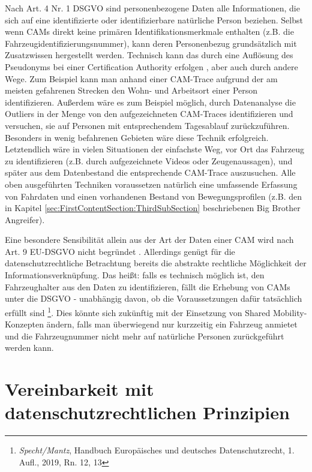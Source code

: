Nach Art. 4 Nr. 1 DSGVO sind personenbezogene Daten alle Informationen, die sich auf eine identifizierte oder identifizierbare natürliche Person beziehen. Selbst wenn CAMs direkt keine primären Identifikationsmerkmale enthalten (z.B. die Fahrzeugidentifizierungsnummer), kann deren Personenbezug grundsätzlich mit Zusatzwissen hergestellt werden. Technisch kann das durch eine Auflösung des Pseudonyms bei einer Certification Authority erfolgen \cite{Kiometzis2017}, aber auch durch andere Wege. Zum Beispiel kann man anhand einer CAM-Trace aufgrund der am meisten gefahrenen Strecken den Wohn- und Arbeitsort einer Person identifizieren. Außerdem wäre es zum Beispiel möglich, durch Datenanalyse die Outliers in der Menge von den aufgezeichneten CAM-Traces identifizieren und versuchen, sie auf Personen mit entsprechendem Tagesablauf zurückzuführen. Besonders in wenig befahrenen Gebieten wäre diese Technik erfolgreich. Letztendlich wäre in vielen Situationen der einfachste Weg, vor Ort das Fahrzeug zu identifizieren (z.B. durch aufgezeichnete Videos oder Zeugenaussagen), und später aus dem Datenbestand die entsprechende CAM-Trace auszusuchen. Alle oben ausgeführten Techniken voraussetzen natürlich eine umfassende Erfassung von Fahrdaten und einen vorhandenen Bestand von Bewegungsprofilen (z.B. den in Kapitel \ref{sec:FirstContentSection:ThirdSubSection} beschriebenen Big Brother Angreifer).

Eine besondere Sensibilität allein aus der Art der Daten einer CAM wird nach Art. 9 EU-DSGVO nicht begründet \cite{Weichert2016}. Allerdings genügt für die datenschutzrechtliche Betrachtung bereits die abstrakte rechtliche Möglichkeit der Informationsverknüpfung. Das heißt: falls es technisch möglich ist, den Fahrzeughalter aus den Daten zu identifizieren, fällt die Erhebung von CAMs unter die DSGVO - unabhängig davon, ob die Voraussetzungen dafür tatsächlich erfüllt sind  \footnote{\emph{Specht/Mantz}, Handbuch Europäisches und deutsches Datenschutzrecht, 1. Aufl., 2019, Rn. 12, 13}. Dies könnte sich zukünftig mit der Einsetzung von Shared Mobility-Konzepten ändern, falls man überwiegend nur kurzzeitig ein Fahrzeug anmietet und die Fahrzeugnummer nicht mehr auf natürliche Personen zurückgeführt werden kann. 


\section{Vereinbarkeit mit datenschutzrechtlichen Prinzipien}
\label{ch:SecondContentSection}

